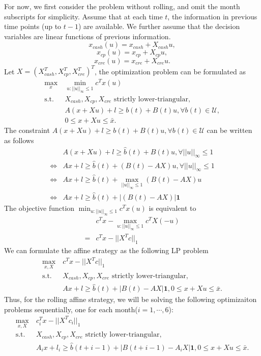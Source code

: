     For now, we first consider the problem without rolling, and omit the month subscripts for simplicity. Assume that at each time $t$, the information in previous time points (up to $t-1$) are available. We further assume that the decision variables are linear functions of previous information.
    \[
        x_{cash}(u) = x_{cash} + X_{cash}u,
    \]
    \[ 
        x_{cp}(u) = x_{cp} + X_{cp}u,
    \]
    \[ 
        x_{cre}(u) = x_{cre} + X_{cre}u.
    \]
    Let $X=(X_{cash}^T, X_{cp}^T, X_{cre}^T)^T$, the optimization problem can be formulated as 
    \[\begin{split}
       \max_x\ & \min_{u:||u||_\infty \leq 1} c^Tx(u) \\
        \text{s.t. } & X_{cash},  X_{cp}, X_{cre} \text{ strictly lower-triangular,}\\
        & A(x + Xu) + l\geq b(t) + B(t)u,\forall b(t) \in \mathcal{U},\\
        & 0\leq x+Xu \leq \bar{x}.
    \end{split}\]
    The constraint $A(x + Xu) + l\geq b(t) + B(t)u,\forall b(t) \in \mathcal{U}$ can be written as follows
    \[\begin{split}
        & A(x + Xu) + l\geq \hat{b}(t) + B(t)u,\forall ||u||_\infty\leq 1 \\
        \iff & Ax+l\geq \hat{b}(t) + (B(t)-AX)u, \forall ||u||_\infty \leq 1 \\
        \iff & Ax+l\geq \hat{b}(t) + \max_{||u||_\infty \leq 1}(B(t)-AX)u \\
        \iff & Ax+l\geq \hat{b}(t) + |(B(t)-AX)|\textbf{1}
    \end{split}\]
    The objective function $\min_{u:||u||_\infty \leq 1} c^Tx(u)$ is equivalent to
    \[\begin{split}
    & c^Tx - \max_{u:||u||_\infty \leq 1} c^TX(-u) \\
    = & c^Tx - ||X^Tc||_1
    \end{split}\]
    We can formulate the affine strategy as the following LP problem
    \[\begin{split}
       \max_{x, X}\ & c^Tx - ||X^Tc||_1  \\
        \text{s.t. } & X_{cash},  X_{cp}, X_{cre} \text{ strictly lower-triangular,}\\
        & Ax + l\geq  \hat{b}(t) + |B(t) - AX|\textbf{1}, 0\leq x+Xu \leq \bar{x}.
    \end{split}\]
    Thus, for the rolling affine strategy, we will be solving the following optimizaiton problems sequentially, one for each month($i = 1, \cdots, 6$):
    \[\begin{split}
       \max_{x, X}\ & c_i^Tx - ||X^Tc_i||_1  \\
        \text{s.t. } & X_{cash},  X_{cp}, X_{cre} \text{ strictly lower-triangular,}\\
        & A_ix + l_i\geq  \hat{b}(t+i-1) + |B(t+i-1) - A_iX|\textbf{1}, 0\leq x+Xu \leq \bar{x}.
    \end{split}\]   



